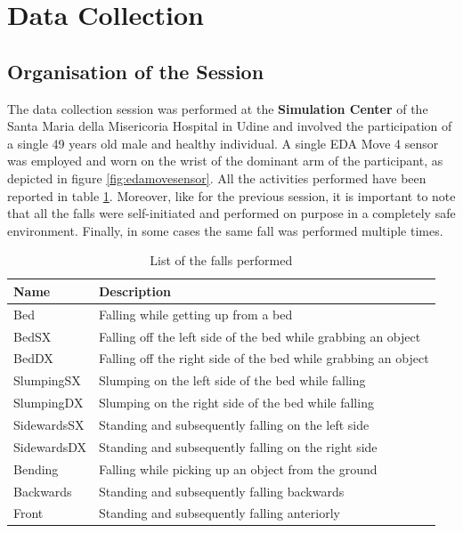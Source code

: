 \newpage

\section{Data Collection}\label{sec:edamove4-data-collection}

\subsection{Organisation of the Session}\label{subsec:session-org}

The data collection session was performed at the \textbf{Simulation Center} of the Santa Maria della Misericoria Hospital in Udine and involved the participation of a single 49 years old male and healthy individual. A single EDA Move 4 sensor was employed and worn on the wrist of the dominant arm of the participant, as depicted in figure \ref{fig:edamovesensor}. All the activities performed have been reported in table \ref{toc:falls-performed-edamove}. Moreover, like for the previous session, it is important to note that all the falls were self-initiated and performed on purpose in a completely safe environment. Finally, in some cases the same fall was performed multiple times.

\begin{table}[H]
\centering
\begin{tabular}{ll}
    \hline
    Name         & Description \\
    \hline
    Bed          & Falling while getting up from a bed \\
    BedSX        & Falling off the left side of the bed while grabbing an object \\
    BedDX        & Falling off the right side of the bed while grabbing an object \\
    SlumpingSX   & Slumping on the left side of the bed while falling  \\
    SlumpingDX   & Slumping on the right side of the bed while falling  \\
    SidewardsSX  & Standing and subsequently falling on the left side \\ 
    SidewardsDX  & Standing and subsequently falling on the right side \\ 
    Bending      & Falling while picking up an object from the ground \\ 
    Backwards    & Standing and subsequently falling backwards \\
    Front        & Standing and subsequently falling anteriorly  \\
    \hline
\end{tabular}
\caption{List of the falls performed}
\label{toc:falls-performed-edamove}
\end{table}

